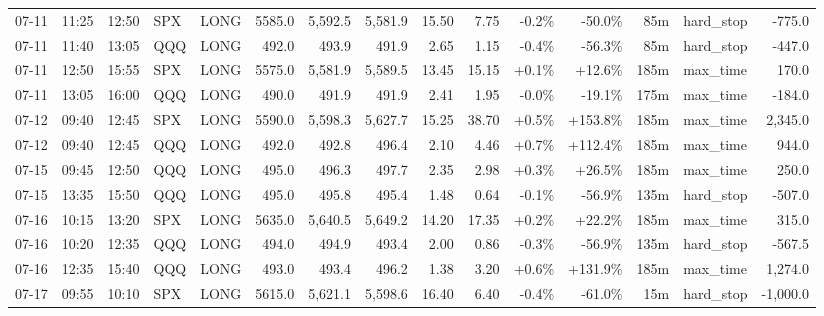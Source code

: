 \documentclass[11pt,a4paper,twoside]{article}
\begin{document}
\begin{landscape}
\begin{center}
\begin{longtable}{>{\color{txtmain}}l l l l l r r r r r r r r >{\color{txtmain}}l r}
07-11 & 11:25 & 12:50 & SPX & LONG & 5585.0 & 5,592.5 & 5,581.9 & 15.50 & 7.75 & \textcolor{lossred}{-0.2\%} & \textcolor{lossred}{-50.0\%} & 85m & hard\_stop & \textcolor{lossred}{-775.0} \\
07-11 & 11:40 & 13:05 & QQQ & LONG & 492.0 & 493.9 & 491.9 & 2.65 & 1.15 & \textcolor{lossred}{-0.4\%} & \textcolor{lossred}{-56.3\%} & 85m & hard\_stop & \textcolor{lossred}{-447.0} \\
07-11 & 12:50 & 15:55 & SPX & LONG & 5575.0 & 5,581.9 & 5,589.5 & 13.45 & 15.15 & \textcolor{wingreen}{+0.1\%} & \textcolor{wingreen}{+12.6\%} & 185m & max\_time & \textcolor{wingreen}{170.0} \\
07-11 & 13:05 & 16:00 & QQQ & LONG & 490.0 & 491.9 & 491.9 & 2.41 & 1.95 & \textcolor{lossred}{-0.0\%} & \textcolor{lossred}{-19.1\%} & 175m & max\_time & \textcolor{lossred}{-184.0} \\
07-12 & 09:40 & 12:45 & SPX & LONG & 5590.0 & 5,598.3 & 5,627.7 & 15.25 & 38.70 & \textcolor{wingreen}{+0.5\%} & \textcolor{wingreen}{+153.8\%} & 185m & max\_time & \textcolor{wingreen}{2,345.0} \\
07-12 & 09:40 & 12:45 & QQQ & LONG & 492.0 & 492.8 & 496.4 & 2.10 & 4.46 & \textcolor{wingreen}{+0.7\%} & \textcolor{wingreen}{+112.4\%} & 185m & max\_time & \textcolor{wingreen}{944.0} \\
07-15 & 09:45 & 12:50 & QQQ & LONG & 495.0 & 496.3 & 497.7 & 2.35 & 2.98 & \textcolor{wingreen}{+0.3\%} & \textcolor{wingreen}{+26.5\%} & 185m & max\_time & \textcolor{wingreen}{250.0} \\
07-15 & 13:35 & 15:50 & QQQ & LONG & 495.0 & 495.8 & 495.4 & 1.48 & 0.64 & \textcolor{lossred}{-0.1\%} & \textcolor{lossred}{-56.9\%} & 135m & hard\_stop & \textcolor{lossred}{-507.0} \\
07-16 & 10:15 & 13:20 & SPX & LONG & 5635.0 & 5,640.5 & 5,649.2 & 14.20 & 17.35 & \textcolor{wingreen}{+0.2\%} & \textcolor{wingreen}{+22.2\%} & 185m & max\_time & \textcolor{wingreen}{315.0} \\
07-16 & 10:20 & 12:35 & QQQ & LONG & 494.0 & 494.9 & 493.4 & 2.00 & 0.86 & \textcolor{lossred}{-0.3\%} & \textcolor{lossred}{-56.9\%} & 135m & hard\_stop & \textcolor{lossred}{-567.5} \\
07-16 & 12:35 & 15:40 & QQQ & LONG & 493.0 & 493.4 & 496.2 & 1.38 & 3.20 & \textcolor{wingreen}{+0.6\%} & \textcolor{wingreen}{+131.9\%} & 185m & max\_time & \textcolor{wingreen}{1,274.0} \\
07-17 & 09:55 & 10:10 & SPX & LONG & 5615.0 & 5,621.1 & 5,598.6 & 16.40 & 6.40 & \textcolor{lossred}{-0.4\%} & \textcolor{lossred}{-61.0\%} & 15m & hard\_stop & \textcolor{lossred}{-1,000.0} \\

\end{longtable}
\end{center}
\end{landscape}
\end{document}
